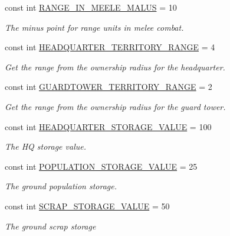 \begin{DoxyCompactItemize}
const int \hyperlink{classCore_1_1Models_1_1Constants_a3132eb59e27938a80a4ca4d047f4912f}{R\+A\+N\+G\+E\+\_\+\+I\+N\+\_\+\+M\+E\+E\+L\+E\+\_\+\+M\+A\+L\+U\+S} = 10
\begin{DoxyCompactList}\small\item\em The minus point for range units in melee combat. \end{DoxyCompactList}\item 
const int \hyperlink{classCore_1_1Models_1_1Constants_a3813d958b2e6df3057078b3569fdff4c}{H\+E\+A\+D\+Q\+U\+A\+R\+T\+E\+R\+\_\+\+T\+E\+R\+R\+I\+T\+O\+R\+Y\+\_\+\+R\+A\+N\+G\+E} = 4
\begin{DoxyCompactList}\small\item\em Get the range from the ownership radius for the headquarter. \end{DoxyCompactList}\item 
const int \hyperlink{classCore_1_1Models_1_1Constants_a64ce972b2af4cf4888944e71e9086dca}{G\+U\+A\+R\+D\+T\+O\+W\+E\+R\+\_\+\+T\+E\+R\+R\+I\+T\+O\+R\+Y\+\_\+\+R\+A\+N\+G\+E} = 2
\begin{DoxyCompactList}\small\item\em Get the range from the ownership radius for the guard tower. \end{DoxyCompactList}\item 
const int \hyperlink{classCore_1_1Models_1_1Constants_afab1e8f29a7e873783bc2c0aabaf4274}{H\+E\+A\+D\+Q\+U\+A\+R\+T\+E\+R\+\_\+\+S\+T\+O\+R\+A\+G\+E\+\_\+\+V\+A\+L\+U\+E} = 100
\begin{DoxyCompactList}\small\item\em The H\+Q storage value. \end{DoxyCompactList}\item 
const int \hyperlink{classCore_1_1Models_1_1Constants_aa59b895c1c117046c226c8864ee6e137}{P\+O\+P\+U\+L\+A\+T\+I\+O\+N\+\_\+\+S\+T\+O\+R\+A\+G\+E\+\_\+\+V\+A\+L\+U\+E} = 25
\begin{DoxyCompactList}\small\item\em The ground population storage. \end{DoxyCompactList}\item 
const int \hyperlink{classCore_1_1Models_1_1Constants_a7084aeeac217877ec00107e5a9b2356a}{S\+C\+R\+A\+P\+\_\+\+S\+T\+O\+R\+A\+G\+E\+\_\+\+V\+A\+L\+U\+E} = 50
\begin{DoxyCompactList}\small\item\em The ground scrap storage \end{DoxyCompactList}\item 

\end{DoxyCompactItemize}
